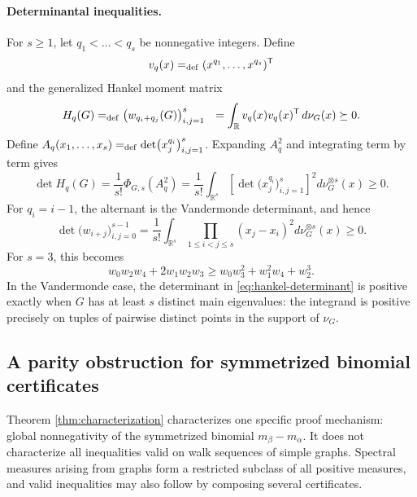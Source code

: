 \documentclass[11pt]{article}
\newcommand{\Real}{\mathbb{R}}
\theoremstyle{remark}
\begin{document}
\medskip

\paragraph{Determinantal inequalities.} 
For $s\ge 1$, let $q_1<\ldots<q_s$ be nonnegative integers. Define
\[
  v_q(x)=_{\rm def}(x^{q_1},\dots,x^{q_s})^{\mathsf T}
\]
and the generalized Hankel moment matrix
\begin{equation*}\label{eq:moment-matrix}
  H_q(G)
  =_{\rm def}\bigl(w_{q_i+q_j}(G)\bigr)_{i,j=1}^s
  ~~=\int_{\Real}v_q(x)v_q(x)^{\mathsf T}\,d\nu_G(x)
  \succeq0.
\end{equation*}
Define $A_q(x_1,\ldots,x_s)=_{\rm def} \det\bigl(x_j^{q_i}\bigr)_{i,j=1}^s$.
Expanding \(A_q^2\) and integrating term by term gives
\begin{equation*}\label{eq:andreief}
  \det H_q(G)
  =\frac{1}{s!}\Phi_{G,s}(A_q^2)
  =\frac{1}{s!}\int_{\Real^s}
     \left[\det\bigl(x_j^{q_i}\bigr)_{i,j=1}^s\right]^2
     d\nu_G^{\otimes s}(x)
  \geq0.
\end{equation*}
For $q_i=i-1$, the alternant is the Vandermonde determinant, and hence
\begin{equation}\label{eq:hankel-determinant}
  \det\bigl(w_{i+j}\bigr)_{i,j=0}^{s-1}
  =\frac{1}{s!}\int_{\Real^s}
     \prod_{1\leq i<j\leq s}(x_j-x_i)^2
     d\nu_G^{\otimes s}(x)
  \geq0.
\end{equation}
For $s=3$, this becomes
\begin{equation*}\label{eq:hankel-3}
  w_0w_2w_4+2w_1w_2w_3
  \geq w_0w_3^2+w_1^2w_4+w_2^3.
\end{equation*}
In the Vandermonde case, the determinant in
\eqref{eq:hankel-determinant} is positive exactly when $G$ has at least $s$ distinct main eigenvalues: the integrand is positive precisely on tuples of pairwise distinct points in the support of $\nu_G$.


\subsection{A parity obstruction for symmetrized binomial certificates}

Theorem \ref{thm:characterization} characterizes one specific proof mechanism: global nonnegativity of the symmetrized binomial $m_\beta-m_\alpha$.  It does not characterize all inequalities valid on walk sequences of simple graphs.  Spectral measures arising from graphs
form a restricted subclass of all positive measures, and valid inequalities may also follow by composing several certificates.
\end{document}
